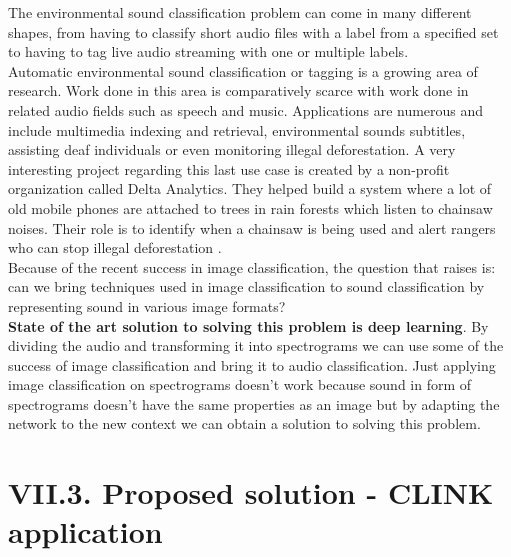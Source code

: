 \documentclass[11pt, a4papper]{report}
\theoremstyle{plain}
\theoremstyle{definition}
\theoremstyle{definition}
\theoremstyle{proposition}
\begin{document}
The environmental sound classification problem can come in many different shapes, from having to classify short audio files with a label from a specified set to having to tag live audio streaming with one or multiple labels.
\\

Automatic environmental sound classification or tagging is a growing area of research. Work done in this area is comparatively scarce with work done in related audio fields such as speech and music. Applications are numerous and include multimedia indexing and retrieval, environmental sounds subtitles, assisting deaf individuals or even monitoring illegal deforestation. A very interesting project regarding this last use case is created by a non-profit organization called Delta Analytics. They helped build a system where a lot of old mobile phones are attached to trees in rain forests which listen to chainsaw noises. Their role is to identify when a chainsaw is being used and alert rangers who can stop illegal deforestation \cite{13}.
\\

Because of the recent success in image classification, the question that raises is: can we bring techniques used in image classification to sound classification by representing sound in various image formats?
\\

\textbf{State of the art solution to solving this problem is deep learning}. By dividing the audio and transforming it into spectrograms we can use some of the success of image classification and bring it to audio classification. Just applying image classification on spectrograms doesn't work because sound in form of spectrograms doesn't have the same properties as an image but by adapting the network to the new context we can obtain a solution to solving this problem.

\section*{VII.3. Proposed solution - CLINK application}
\
\end{document}
